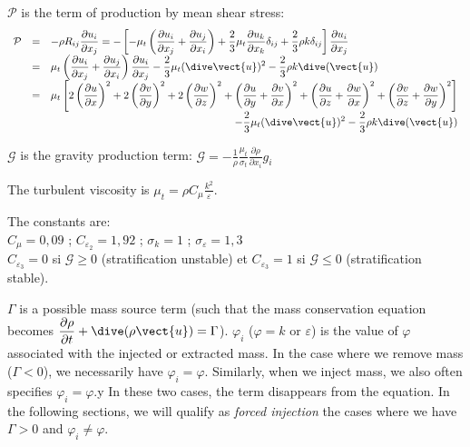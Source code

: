 $\mathcal{P}$ is the term of production by mean shear stress:
\begin{displaymath}
\begin{array}{rcl}
\mathcal{P} & = & \displaystyle -\rho R_{ij}\frac{\partial u_i}{\partial x_j}
= -\left[-\mu_t \left(\frac{\partial u_i}{\partial x_j} +
\frac{\partial u_j}{\partial x_i}\right)
+\frac{2}{3}\mu_t\frac{\partial u_k}{\partial x_k}\delta_{ij}
+\frac{2}{3}\rho k\delta_{ij}\right]
\frac{\partial u_i}{\partial x_j}\\
& = & \displaystyle \mu_t \left(\frac{\partial u_i}{\partial x_j} +
\frac{\partial u_j}{\partial x_i}\right)\frac{\partial u_i}{\partial x_j}
-\frac{2}{3}\mu_t(\dive\vect{u})^2-\frac{2}{3}\rho k \dive(\vect{u})\\
& = & \displaystyle \mu_t \left[
2\left(\frac{\partial u}{\partial x}\right)^2+
2\left(\frac{\partial v}{\partial y}\right)^2+
2\left(\frac{\partial w}{\partial z}\right)^2+
\left(\frac{\partial u}{\partial y}+\frac{\partial v}{\partial x}\right)^2+
\left(\frac{\partial u}{\partial z}+\frac{\partial w}{\partial x}\right)^2+
\left(\frac{\partial v}{\partial z}+\frac{\partial w}{\partial y}\right)^2
\right]\\
\multicolumn{3}{r}%
{\displaystyle -\frac{2}{3}\mu_t(\dive\vect{u})^2-\frac{2}{3}\rho k \dive(\vect{u})}
\end{array}
\end{displaymath}

$\mathcal{G}$ is the gravity production term:
$\displaystyle
\mathcal{G}=-\frac{1}{\rho}\frac{\mu_t}{\sigma_t}
\frac{\partial\rho}{\partial x_i}g_i$

The turbulent viscosity is
$\displaystyle \mu_t=\rho C_\mu\frac{k^2}{\varepsilon}$.

The constants are:\\
$C_\mu=0,09$ ;
$C_{\varepsilon_2}=1,92$ ; $\sigma_k=1$ ; $\sigma_\varepsilon=1,3$\\
$C_{\varepsilon_3}=0$ si $\mathcal{G}\geqslant0$ (stratification unstable) et
$C_{\varepsilon_3}=1$ si $\mathcal{G}\leqslant0$ (stratification stable).

$\Gamma$ is a possible mass source term (such that the mass conservation equation becomes
$\displaystyle \frac{\partial \rho}{\partial t}+\dive(\rho\vect{u})=\Gamma$).
$\varphi_i$ ($\varphi=k$ or $\varepsilon$) is the value of $\varphi$
associated with the injected or extracted mass. In the case where we remove
mass ($\Gamma<0$), we necessarily have $\varphi_i=\varphi$.
Similarly, when we inject mass, we also often specifies $\varphi_i=\varphi$.y
In these two cases, the term disappears from the equation. In the following sections,
we will qualify as {\em forced injection} the cases where we have $\Gamma>0$ and
$\varphi_i\ne\varphi$.

